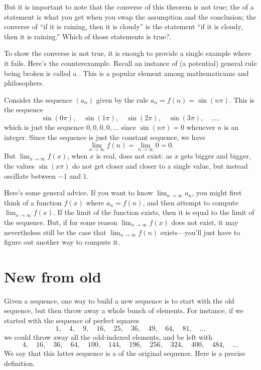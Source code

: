 \documentclass{ximera}
\begin{document}
But it is important to note that the converse of this theorem is not
true; \label{sidenote:raining-converse}the  of a
statement is what you get when you swap the assumption and the
conclusion; the converse of ``if it is raining, then it is cloudy'' is
the statement ``if it is cloudy, then it is raining.''  Which of those
statements is true?.

To show the converse is not true, it is enough to provide a single
example where it fails.  Here's the counterexample.  Recall an
instance of (a potential) general rule being broken is called a
.  This is a popular element among
mathematicians and philosophers.

\begin{example}
  Consider the sequence $(a_n)$ given by the rule $a_n = f(n)=\sin(n\pi)$.  This is the sequence
$$
  \sin(0\pi),\quad \sin(1\pi),\quad\sin(2\pi),\quad\sin(3\pi),\quad\ldots,
$$
which is just the sequence $0, 0, 0, 0, \ldots$ since $\sin(n\pi)=0$
whenever $n$ is an integer.  Since the sequence is just the constant sequence, we have
$$
\lim_{n\to\infty} f(n)= \lim_{n\to\infty} 0 = 0. 
$$But $\displaystyle\lim_{x\to\infty}f(x)$, when $x$ is real, does not exist: as $x$ gets
bigger and bigger, the values $\sin(x\pi)$ do not get closer and
closer to a single value, but instead oscillate between $-1$ and $1$.
\end{example} 

Here's some general advice. If you want to know $\displaystyle\lim_{n\to\infty}
a_n$, you might first think of a function $f(x)$ where $a_n = f(n)$,
and then attempt to compute $\displaystyle\lim_{x\to\infty}f(x)$.  If the limit
of the function exists, then it is equal to the limit of the sequence.
But, if for some reason $\displaystyle\lim_{x\to\infty}f(x)$ does not exist, it
may nevertheless still be the case that $\displaystyle\lim_{n\to\infty}f(n)$
exists---you'll just have to figure out another way to compute it.


\section{New from old}

Given a sequence, one way to build a new sequence is to start with the
old sequence, but then throw away a whole bunch of elements.  For
instance, if we started with the sequence of perfect squares
$$
1,\quad 4,\quad 9,\quad 16,\quad 25,\quad 36,\quad 49,\quad 64,\quad 81,\quad\ldots
$$
we could throw away all the odd-indexed elements, and be left with
$$
4,\quad 16,\quad 36,\quad 64,\quad 100,\quad 144,\quad 196,\quad 256,\quad 324,\quad 400,\quad 484,\quad\ldots
$$
We say that this latter sequence is a
of the original sequence.  Here is a precise definition.
\end{document}
